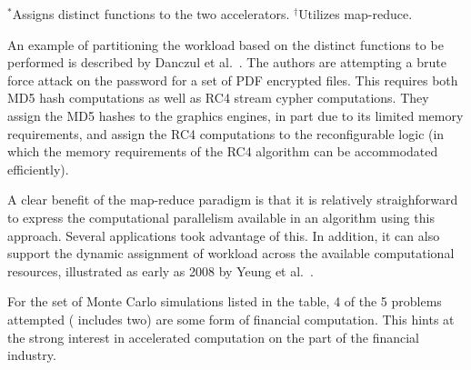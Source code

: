 \begin{table}[htp]
$^*$Assigns distinct functions to the two accelerators. $^\dag$Utilizes map-reduce.
\end{table}

An example of partitioning the workload based on the distinct functions to be
performed is described by Danczul et al.~\cite{dfg+13}. The authors are
attempting a brute force attack on the password for a set of PDF encrypted
files.  This requires both MD5 hash computations as well as RC4 stream cypher 
computations.  They assign the MD5 hashes to the graphics engines, in part
due to its limited memory requirements, and assign the RC4 computations to the
reconfigurable logic (in which the memory requirements of the RC4 algorithm
can be accommodated efficiently).

A clear benefit of the map-reduce paradigm is that it is relatively
straighforward to express the computational parallelism available in
an algorithm using this approach.  Several applications took advantage
of this.  In addition, it can also support the dynamic assignment of
workload across the available computational resources, illustrated as
early as 2008 by Yeung et al.~\cite{ytt+08}.

For the set of Monte Carlo simulations listed in the table,
4 of the 5 problems attempted
(\cite{tttl10} includes two) are some form of financial computation.
This hints at the strong interest in accelerated computation on the
part of the financial industry.

